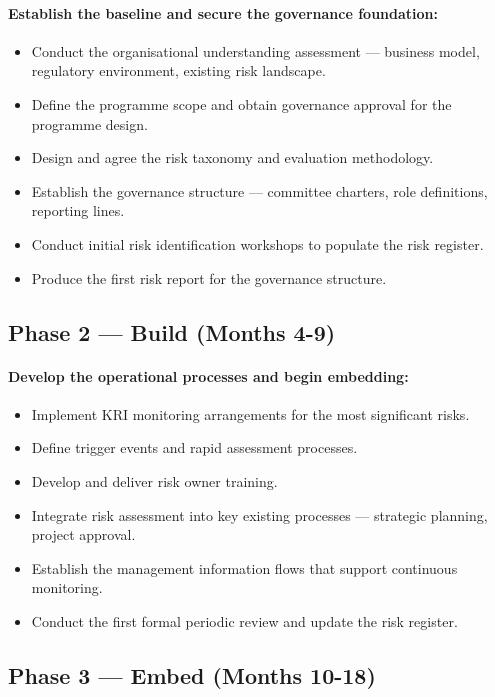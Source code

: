 \paragraph{Establish the baseline and secure the governance foundation:}
\begin{itemize}
  \item{Conduct the organisational understanding assessment — business model, regulatory environment, existing risk landscape.}
  \item{Define the programme scope and obtain governance approval for the programme design.}
  \item{Design and agree the risk taxonomy and evaluation methodology.}
  \item{Establish the governance structure — committee charters, role definitions, reporting lines.}
  \item{Conduct initial risk identification workshops to populate the risk register.}
  \item{Produce the first risk report for the governance structure.}
\end{itemize}

\subsection{Phase 2 — Build (Months 4-9)}
\paragraph{Develop the operational processes and begin embedding:}
\begin{itemize}
  \item{Implement KRI monitoring arrangements for the most significant risks.}
  \item{Define trigger events and rapid assessment processes.}
  \item{Develop and deliver risk owner training.}
  \item{Integrate risk assessment into key existing processes — strategic planning, project approval.}
  \item{Establish the management information flows that support continuous monitoring.}
  \item{Conduct the first formal periodic review and update the risk register.}
\end{itemize}

\subsection{Phase 3 — Embed (Months 10-18)}
